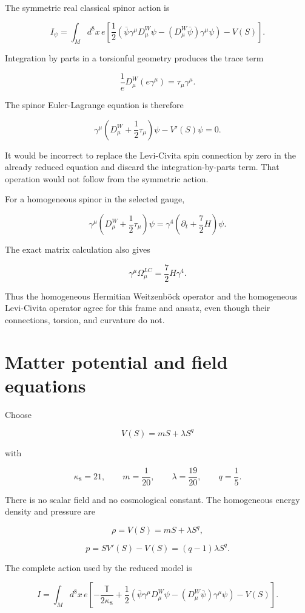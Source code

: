 \documentclass[11pt]{article}
\begin{document}
The symmetric real classical spinor action is

\[
I_\psi=\int_Md^8x\,e\left[
\frac12\left(
\bar\psi\gamma^\mu D^W_\mu\psi
-(D^W_\mu\bar\psi)\gamma^\mu\psi
\right)-V(S)\right].
\]

Integration by parts in a torsionful geometry produces the trace term

\[
\frac1eD^W_\mu(e\gamma^\mu)=\tau_\mu\gamma^\mu.
\]

The spinor Euler-Lagrange equation is therefore

\[
\boxed{
\gamma^\mu\left(D^W_\mu+\frac12\tau_\mu\right)\psi
-V'(S)\psi=0.}
\]

It would be incorrect to replace the Levi-Civita spin connection by zero in the already reduced equation and discard the integration-by-parts term. That operation would not follow from the symmetric action.

For a homogeneous spinor in the selected gauge,

\[
\gamma^\mu\left(D^W_\mu+\frac12\tau_\mu\right)\psi
=\gamma^4\left(\partial_t+\frac72H\right)\psi.
\]

The exact matrix calculation also gives

\[
\gamma^\mu\Omega^{LC}_\mu
=\frac72H\gamma^4.
\]

Thus the homogeneous Hermitian Weitzenböck operator and the homogeneous Levi-Civita operator agree for this frame and ansatz, even though their connections, torsion, and curvature do not.

\section{Matter potential and field equations}

Choose

\[
V(S)=mS+\lambda S^q
\]

with

\[
\kappa_8=21,
\qquad
m=\frac1{20},
\qquad
\lambda=\frac{19}{20},
\qquad
q=\frac15.
\]

There is no scalar field and no cosmological constant. The homogeneous energy density and pressure are

\[
\rho=V(S)=mS+\lambda S^q,
\]

\[
p=SV'(S)-V(S)=(q-1)\lambda S^q.
\]

The complete action used by the reduced model is

\[
\boxed{
I=\int_Md^8x\,e\left[
-\frac{\mathbb T}{2\kappa_8}
+\frac12\left(
\bar\psi\gamma^\mu D^W_\mu\psi
-(D^W_\mu\bar\psi)\gamma^\mu\psi
\right)-V(S)
\right].}
\]
\end{document}
